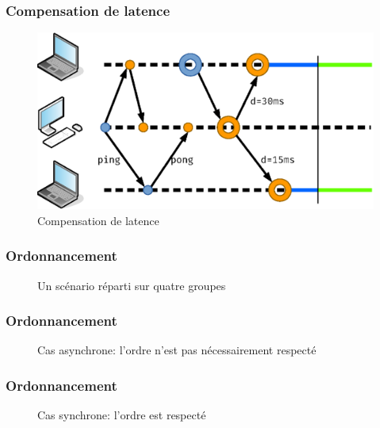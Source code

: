 \documentclass[]{beamer}
\begin{document}
\begin{frame}
\frametitle{Compensation de latence}
\begin{figure}
	\centering
	\includegraphics[width=\textwidth]{draw/compensated.eps}
	\caption{Compensation de latence}
\end{figure}
\end{frame}

\begin{frame}
\frametitle{Ordonnancement}
\centering
\Large
\begin{figure}
\begin{tikzpicture}[scale=2]

\end{tikzpicture}
\caption{Un scénario réparti sur quatre groupes}
\end{figure}
\end{frame}

\begin{frame}
\frametitle{Ordonnancement}
\centering
\large
\begin{figure}
	\begin{tikzpicture}[scale=1.1]
	
	\end{tikzpicture}
	\caption{Cas asynchrone: l'ordre n'est pas nécessairement respecté}
\end{figure}
\end{frame}

\begin{frame}
\frametitle{Ordonnancement}
\centering
\large
\begin{figure}
\begin{tikzpicture}[scale=1.1]

\end{tikzpicture}
\caption{Cas synchrone: l'ordre est respecté}
\end{figure}
\end{frame}
\end{document}
